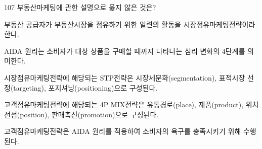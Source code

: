 \begin{question}{107}
부동산마케팅에 관한 설명으로 옳지 않은 것은?
\begin{choices}
  \item 부동산 공급자가 부동산시장을 점유하기 위한 일련의 활동을 시장점유마케팅전략이라 한다.
  \item AIDA 원리는 소비자가 대상 상품을 구매할 때까지 나타나는 심리 변화의 4단계를 의미한다.
  \item 시장점유마케팅전략에 해당되는 STP전략은 시장세분화(segmentation), 표적시장 선정(targeting), 포지셔닝(positioning)으로 구성된다.
  \item 고객점유마케팅전략에 해당되는 4P MIX전략은 유통경로(place), 제품(product), 위치선점(position), 판매촉진(promotion)으로 구성된다.
  \item 고객점유마케팅전략은 AIDA 원리를 적용하여 소비자의 욕구를 충족시키기 위해 수행된다.
\end{choices}
\end{question}
